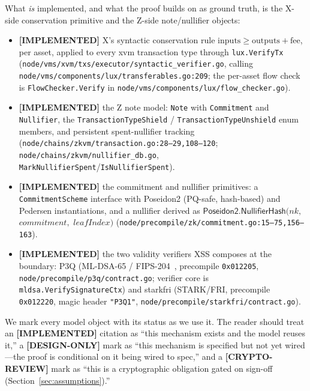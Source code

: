 \documentclass[11pt]{article}
\theoremstyle{definition}
\theoremstyle{remark}
\newcommand{\IMPL}{\textbf{[IMPLEMENTED]}}
\newcommand{\DESIGN}{\textbf{[DESIGN-ONLY]}}
\newcommand{\CRYPTO}{\textbf{[CRYPTO-REVIEW]}}
\begin{document}
What \emph{is} implemented, and what the proof builds on as ground truth,
is the X-side conservation primitive and the Z-side note/nullifier
objects:
\begin{itemize}[leftmargin=2em,nosep]
\item \IMPL{} X's syntactic conservation rule
  $\mathrm{inputs}\ge\mathrm{outputs}+\mathrm{fee}$, per asset, applied to
  every xvm transaction type through \texttt{lux.VerifyTx}
  (\texttt{node/vms/xvm/txs/\allowbreak executor/\allowbreak syntactic\_verifier.go},
  calling
  \texttt{node/vms/components/\allowbreak lux/transferables.go:209}; the
  per-asset flow check is \texttt{FlowChecker.Verify} in
  \texttt{node/vms/components/\allowbreak lux/flow\_checker.go}).
\item \IMPL{} the Z note model: \texttt{Note} with \texttt{Commitment} and
  \texttt{Nullifier}, the \texttt{TransactionTypeShield} /
  \texttt{TransactionTypeUnshield} enum members, and persistent
  spent-nullifier tracking
  (\texttt{node/chains/zkvm/transaction.go:28--29,108--120};
  \texttt{node/chains/zkvm/nullifier\_db.go},
  \texttt{MarkNullifierSpent}/\texttt{IsNullifierSpent}).
\item \IMPL{} the commitment and nullifier primitives: a
  \texttt{CommitmentScheme} interface with Poseidon2 (PQ-safe,
  hash-based) and Pedersen instantiations, and a nullifier derived as
  $\textsf{Poseidon2.NullifierHash}(\textit{nk},$ $\textit{commitment},$
  $\textit{leafIndex})$
  (\texttt{node/precompile/\allowbreak zk/commitment.go:15--75,156--163}).
\item \IMPL{} the two validity verifiers XSS composes at the boundary:
  P3Q (ML-DSA-65 / FIPS-204~\cite{fips204}, precompile \texttt{0x012205},
  \texttt{node/precompile/p3q/contract.go}; verifier core is
  \texttt{mldsa.VerifySignatureCtx}) and starkfri (STARK/FRI, precompile
  \texttt{0x012220}, magic header \texttt{"P3Q1"},
  \texttt{node/precompile/starkfri/contract.go}).
\end{itemize}

\noindent We mark every model object with its status as we use it. The
reader should treat an \IMPL{} citation as ``this mechanism exists and the
model reuses it,'' a \DESIGN{} mark as ``this mechanism is specified but
not yet wired---the proof is conditional on it being wired to spec,'' and
a \CRYPTO{} mark as ``this is a cryptographic obligation gated on
sign-off (Section~\ref{sec:assumptions}).''

\end{document}
